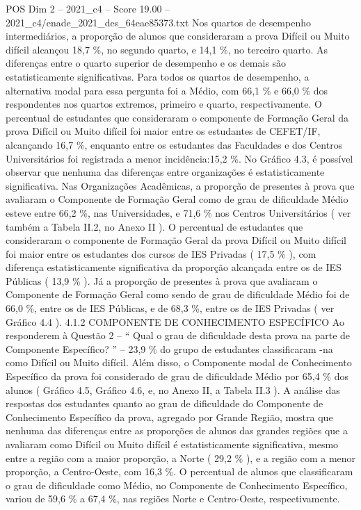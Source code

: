 \begin{textsample}{POS Dim 2 – 2021\_c4 – Score 19.00 – 2021\_c4/enade\_2021\_des\_64eae85373.txt}
Nos quartos de desempenho intermediários, a proporção de alunos que consideraram a prova Difícil ou Muito difícil alcançou 18,7 \%, no segundo quarto, e 14,1 \%, no terceiro quarto.
As diferenças entre o quarto superior de desempenho e os demais são estatisticamente significativas.
Para todos os quartos de desempenho, a alternativa modal para essa pergunta foi a Médio, com 66,1 \% e 66,0 \% dos respondentes nos quartos extremos, primeiro e quarto, respectivamente.
O percentual de estudantes que consideraram o componente de Formação Geral da prova Difícil ou Muito difícil foi maior entre os estudantes de CEFET/IF, alcançando 16,7 \%, enquanto entre os estudantes das Faculdades e dos Centros Universitários foi registrada a menor incidência:15,2 \%.
No Gráfico 4.3, é possível observar que nenhuma das diferenças entre organizações é estatisticamente significativa.
Nas Organizações Acadêmicas, a proporção de presentes à prova que avaliaram o Componente de Formação Geral como de grau de dificuldade Médio esteve entre 66,2 \%, nas Universidades, e 71,6 \% nos Centros Universitários ( ver também a Tabela II.2, no Anexo II ).
O percentual de estudantes que consideraram o componente de Formação Geral da prova Difícil ou Muito difícil foi maior entre os estudantes dos cursos de IES Privadas ( 17,5 \% ), com diferença estatisticamente significativa da proporção alcançada entre os de IES Públicas ( 13,9 \% ).
Já a proporção de presentes à prova que avaliaram o Componente de Formação Geral como sendo de grau de dificuldade Médio foi de 66,0 \%, entre os de IES Públicas, e de 68,3 \%, entre os de IES Privadas ( ver Gráfico 4.4 ). 4.1.2 COMPONENTE DE CONHECIMENTO ESPECÍFICO Ao responderem à Questão 2 – “ Qual o grau de dificuldade desta prova na parte de Componente Específico? ” – 23,9 \% do grupo de estudantes classificaram -na como Difícil ou Muito difícil.
Além disso, o Componente modal de Conhecimento Específico da prova foi considerado de grau de dificuldade Médio por 65,4 \% dos alunos ( Gráfico 4.5, Gráfico 4.6, e, no Anexo II, a Tabela II.3 ).
A análise das respostas dos estudantes quanto ao grau de dificuldade do Componente de Conhecimento Específico da prova, agregado por Grande Região, mostra que nenhuma das diferenças entre as proporções de alunos das grandes regiões que a avaliaram como Difícil ou Muito difícil é estatisticamente significativa, mesmo entre a região com a maior proporção, a Norte ( 29,2 \% ), e a região com a menor proporção, a Centro-Oeste, com 16,3 \%.
O percentual de alunos que classificaram o grau de dificuldade como Médio, no Componente de Conhecimento Específico, variou de 59,6 \% a 67,4 \%, nas regiões Norte e Centro-Oeste, respectivamente.

\end{textsample}
